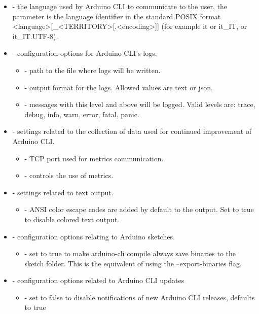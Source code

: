 \begin{itemize}
    \item {} - the language used by Arduino CLI to communicate to the user, the parameter is the language identifier in the standard POSIX format <language>[\_<TERRITORY>[.<encoding>]] (for example it or it\_IT, or it\_IT.UTF-8).
    \item {} - configuration options for Arduino CLI's logs.
    \begin{itemize}
        \item {} - path to the file where logs will be written.
        \item {} - output format for the logs. Allowed values are text or json.
        \item {} - messages with this level and above will be logged. Valid levels are: trace, debug, info, warn, error, fatal, panic.
    \end{itemize}
    \item {} - settings related to the collection of data used for continued improvement of Arduino CLI.
    \begin{itemize}
        \item {} - TCP port used for metrics communication.
        \item {} - controls the use of metrics.
    \end{itemize}
    \item {} - settings related to text output.
    \begin{itemize}
        \item {} - ANSI color escape codes are added by default to the output. Set to true to disable colored text output.
    \end{itemize}
    \item {} - configuration options relating to Arduino sketches.
    \begin{itemize}
        \item {} - set to true to make arduino-cli compile always save binaries to the sketch folder. This is the equivalent of using the --export-binaries flag.
    \end{itemize}
    \item {} - configuration options related to Arduino CLI updates
    \begin{itemize}
        \item {} - set to false to disable notifications of new Arduino CLI releases, defaults to true

\end{itemize}
\end{itemize}
